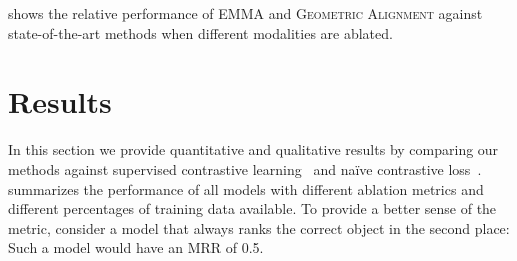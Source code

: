 \documentclass[sigconf,natbib=true,anonymous=true]{acmart}
\newcommand{\ours}{\textsc{EMMA}}
\newcommand{\geom}{\textsc{Geometric Alignment}}
\begin{document}
 shows the relative performance of \ours{} and \geom{} against state-of-the-art methods when different modalities are ablated.


\section{Results}
\label{sec:results}

In this section we provide quantitative and qualitative results by comparing our methods against supervised contrastive learning~\citep{NEURIPS2020_supervised_contrastive} and na\"ive contrastive loss~\citep{chen2020simple}.
 summarizes the performance of all models with different ablation metrics and different percentages of training data available.
To provide a better sense of the metric, consider a model that always ranks the correct object in the second place: Such a model would have an MRR of 0.5.
\end{document}
